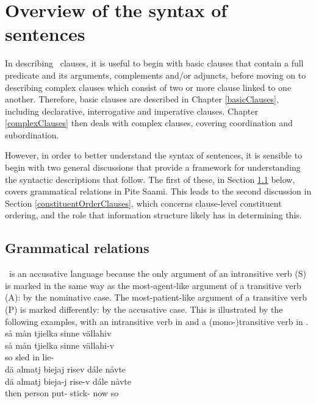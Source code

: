 \tableofcontents\clearpage



\chapter{Overview of the syntax of sentences}\label{overviewSyntax}
In describing \PS\ clauses, it is useful to begin with basic clauses that contain a full predicate and its arguments, complements and/or adjuncts, before moving on to describing complex clauses which consist of two or more clause linked to one another. 
Therefore, basic clauses are described in Chapter \ref{basicClauses}, including declarative, interrogative and imperative clauses. Chapter \ref{complexClauses} then deals with complex clauses, covering coordination and subordination. 

However, in order to better understand the syntax of sentences, it is sensible to begin with two general discussions that provide a framework for understanding the syntactic descriptions that follow. The first of these, in Section \ref{grammaticalRelations} below, covers grammatical relations in Pite Saami. This leads to the second discussion in Section \ref{constituentOrderClauses}, which concerns clause-level constituent ordering, and the role that information structure likely has in determining this.


\section{Grammatical relations}\label{grammaticalRelations}
\PS\ is an accusative language because %
the only argument of an intransitive verb (S) is marked in the same way as %
the most-agent-like argument of a transitive verb (A): by the nominative case. The %
most-patient-like argument of a transitive verb (P) is marked differently: by the accusative case. This is illustrated by the following examples, with an intransitive verb in  and a (mono-)transitive verb in .
\ea\label{intrans1}
\glll	så mån tjielka sinne vällahiv\\
	så mån tjielka sinne vällahi-v\\
	so  sled\BS{} in lie-\\\nopagebreak
{} 
\z
\ea\label{monotrans1}
\glll	dä almatj biejaj risev dále nåvte\\
	dä almatj bieja-j rise-v dále nåvte\\
	then person\BS{} put- stick- now so\\\nopagebreak
{} 
\z

